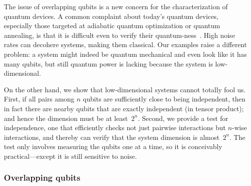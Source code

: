 \documentclass[11pt]{article}
\begin{document}
The issue of overlapping qubits is a new concern for the characterization of quantum devices.  A common complaint about today's quantum devices, especially those targeted at adiabatic quantum optimization or quantum annealing, is that it is difficult even to verify their quantum-ness~\cite{AlbashHenSpedalieriLidar15dwave}.  High noise rates can decohere systems, making them classical.  Our examples raise a different problem: a system might indeed be quantum mechanical and even look like it has many qubits, but still quantum power is lacking because the system is low-dimensional.  

On the other hand, we show that low-dimensional systems cannot totally fool us.  First, if all pairs among $n$ qubits are sufficiently close to being independent, then in fact there are nearby qubits that are exactly independent (in tensor product); and hence the dimension must be at least~$2^n$.  Second, we provide a test for independence, one that efficiently checks not just pairwise interactions but $n$-wise interactions, and thereby can verify that the system dimension is almost~$2^n$.  The test only involves measuring the qubits one at a time, so it is conceivably practical---except it is still sensitive to noise.  


\subsubsection*{Overlapping qubits}
\end{document}
